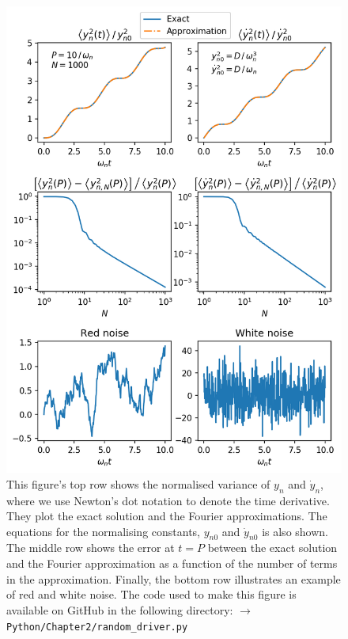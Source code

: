 \begin{figure}
    \centering
    \vspace{-20pt}
    \includegraphics[width=\textwidth,height=0.8\textheight,keepaspectratio]{figures/chapter02/noisy_driver.png}
    \vspace{-10pt}
    \caption{This figure's top row shows the normalised variance of $y_n$ and $\dot{y}_n$, where we use Newton's dot notation to denote the time derivative. They plot the exact solution and the Fourier approximations. The equations for the normalising constants, $y_{n0}$ and $\dot{y}_{n0}$ is also shown. The middle row shows the error at $t=P$ between the exact solution and the Fourier approximation as a function of the number of terms in the approximation. Finally, the bottom row illustrates an example of red and white noise. The code used to make this figure is available on GitHub in the following directory:\newline
    \texttt{$\rightarrow$ Python/Chapter2/random\_driver.py}}
    \vspace{-20pt}
    \label{fig:noisy_driver}
\end{figure}

